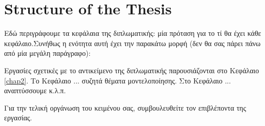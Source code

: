 \section{Structure of the Thesis}

Εδώ περιγράφουμε τα κεφάλαια της διπλωματικής: μία πρόταση για το τί θα έχει  κάθε κεφάλαιο.Συνήθως η ενότητα αυτή έχει την παρακάτω μορφή (δεν θα σας πάρει πάνω από μία μεγάλη παράγραφο):

Εργασίες σχετικές με το αντικείμενο της διπλωματικής παρουσιάζονται στο Κεφάλαιο \ref{chap2}. Το Κεφάλαιο ... συζητά θέματα μοντελοποίησης. Στο Κεφάλαιο ... αναπτύσσουμε κ.λ.π. 

Για την τελική οργάνωση του κειμένου σας, συμβουλευθείτε τον επιβλέποντα της εργασίας.



